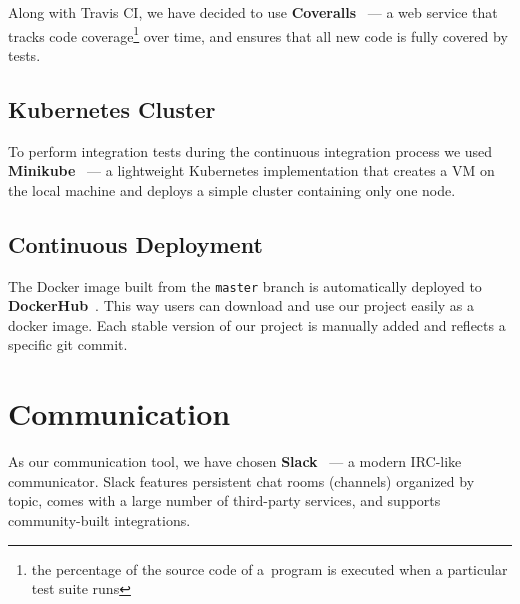 Along with Travis CI, we have 
decided to use \textbf{Coveralls}~\cite{coveralls} --- a web service that 
tracks code coverage\footnote{the percentage of the source code of a~program 
is executed when a particular test suite runs} over time, and ensures that 
all new code is fully covered by tests.

\subsection{Kubernetes Cluster}
To perform integration tests during the continuous integration process we 
used \textbf{Minikube}~\cite{minikube} --- a lightweight
Kubernetes implementation that creates a VM on the local machine and deploys 
a simple cluster containing only one node.

\subsection{Continuous Deployment}
The Docker image built from the \texttt{master} branch is automatically 
deployed to \textbf{DockerHub}~\cite{docker}. This way users can download
and use our project easily as a docker image. Each stable version of our 
project is manually added and reflects a specific git commit.

\section{Communication}
As our communication tool, we have chosen \textbf{Slack}~\cite{slack} --- 
a modern IRC-like communicator. Slack features persistent chat rooms
(channels) organized by topic, comes with a large number of third-party 
services, and supports community-built integrations.
